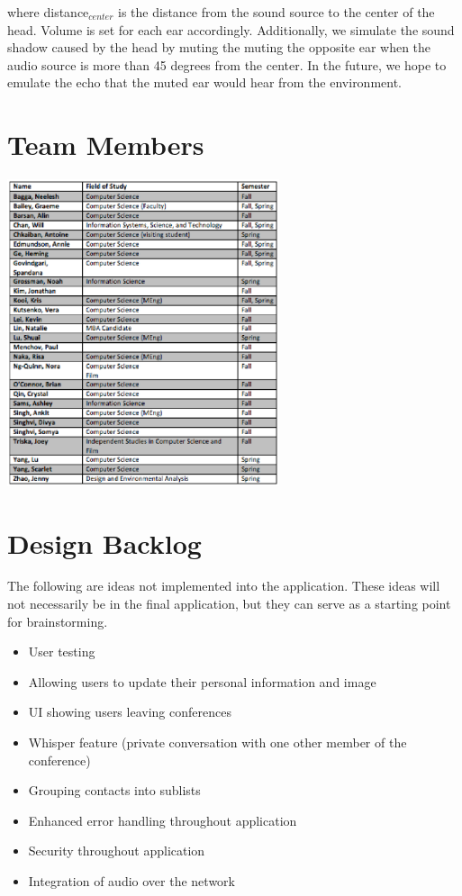 \documentclass[12pt, letterpaper]{article}
\begin{document}
where distance$_{center}$ is the distance from the sound source to the center of the head. Volume is set for each ear accordingly. Additionally, we simulate the sound shadow caused by the head by muting the muting the opposite ear when the audio source is more than 45 degrees from the center. In the future, we hope to emulate the echo that the muted ear would hear from the environment.

{\footnotesize 
}

\clearpage
\onecolumn
\begin{center}
\appendix
\section{Team Members}
\includegraphics[width=0.6\textwidth]{teammembers.eps}

\clearpage
\section{Design Backlog}
{\raggedright The following are ideas not implemented into the application.  These ideas will not necessarily be in the final application, but they can serve as a starting point for brainstorming.
\begin{itemize}
\item User testing
\item Allowing users to update their personal information and image
\item UI showing users leaving conferences
\item Whisper feature (private conversation with one other member of the conference)
\item Grouping contacts into sublists
\item Enhanced error handling throughout application
\item Security throughout application
\item Integration of audio over the network
\end{itemize}
}
\clearpage

\end{center}
\end{document}
